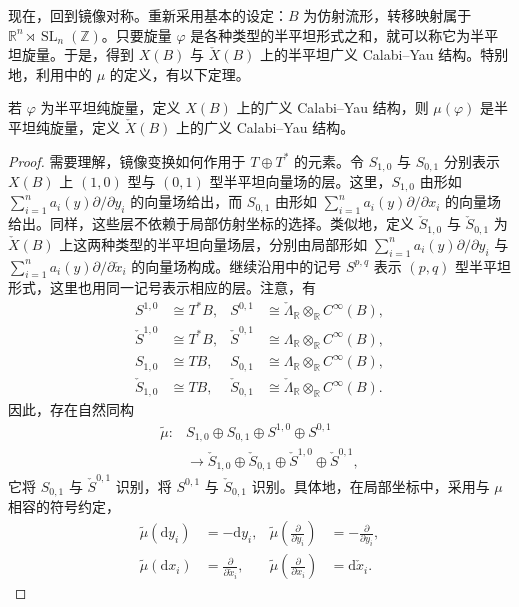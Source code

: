 现在，回到镜像对称。重新采用基本的设定：$B$ 为仿射流形，转移映射属于 $\mathbb R^n\rtimes\operatorname{SL}_n(\mathbb Z)$。只要旋量 $\varphi$ 是各种类型的半平坦形式之和，就可以称它为半平坦旋量。于是，得到 $X(B)$ 与 $\check X(B)$ 上的半平坦广义 Calabi--Yau 结构。特别地，利用中的 $\mu$ 的定义，有以下定理。

\begin{theorem}\label{thm:6.39}
若 $\varphi$ 为半平坦纯旋量，定义 $X(B)$ 上的广义 Calabi--Yau 结构，则 $\mu(\varphi)$ 是半平坦纯旋量，定义 $\check X(B)$ 上的广义 Calabi--Yau 结构。
\end{theorem}
\begin{proof}
需要理解，镜像变换如何作用于 $T\oplus T^*$ 的元素。令 $S_{1,0}$ 与 $S_{0,1}$ 分别表示 $X(B)$ 上 $(1,0)$ 型与 $(0,1)$ 型半平坦向量场的层。这里，$S_{1,0}$ 由形如 $\sum_{i=1}^na_i(y)\partial/\partial y_i$ 的向量场给出，而 $S_{0,1}$ 由形如 $\sum_{i=1}^na_i(y)\partial/\partial x_i$ 的向量场给出。同样，这些层不依赖于局部仿射坐标的选择。类似地，定义 $\check S_{1,0}$ 与 $\check S_{0,1}$ 为 $\check X(B)$ 上这两种类型的半平坦向量场层，分别由局部形如 $\sum_{i=1}^na_i(y)\partial/\partial y_i$ 与 $\sum_{i=1}^na_i(y)\partial/\partial\check x_i$ 的向量场构成。继续沿用中的记号 $S^{p,q}$ 表示 $(p,q)$ 型半平坦形式，这里也用同一记号表示相应的层。注意，有
\[
\begin{aligned}
S^{1,0}&\cong T^*B,&
S^{0,1}&\cong\check\Lambda_{\mathbb R}\otimes_{\mathbb R}C^\infty(B),\\
\check S^{1,0}&\cong T^*B,&
\check S^{0,1}&\cong\Lambda_{\mathbb R}\otimes_{\mathbb R}C^\infty(B),\\
S_{1,0}&\cong TB,&
S_{0,1}&\cong\Lambda_{\mathbb R}\otimes_{\mathbb R}C^\infty(B),\\
\check S_{1,0}&\cong TB,&
\check S_{0,1}&\cong\check\Lambda_{\mathbb R}\otimes_{\mathbb R}C^\infty(B).
\end{aligned}
\]
因此，存在自然同构
\[
\begin{aligned}
\widetilde\mu\colon&S_{1,0}\oplus S_{0,1}\oplus S^{1,0}\oplus S^{0,1}\\
&\longrightarrow\check S_{1,0}\oplus\check S_{0,1}
\oplus\check S^{1,0}\oplus\check S^{0,1},
\end{aligned}
\]
它将 $S_{0,1}$ 与 $\check S^{0,1}$ 识别，将 $S^{0,1}$ 与 $\check S_{0,1}$ 识别。具体地，在局部坐标中，采用与 $\mu$ 相容的符号约定，
\[
\begin{aligned}
\widetilde\mu(\mathrm dy_i)&=-\mathrm dy_i,&
\widetilde\mu\!\left(\frac{\partial}{\partial y_i}\right)&=-\frac{\partial}{\partial y_i},\\
\widetilde\mu(\mathrm dx_i)&=\frac{\partial}{\partial\check x_i},&
\widetilde\mu\!\left(\frac{\partial}{\partial x_i}\right)&=\mathrm d\check x_i.
\end{aligned}
\]


\end{proof}
